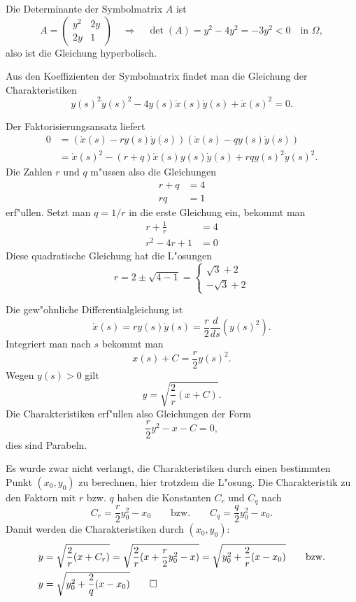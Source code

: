 \begin{loesung}
\begin{teilaufgaben}
\item
Die Determinante der Symbolmatrix $A$ ist
\[
A=\begin{pmatrix}
y^2&2y\\
2y&1
\end{pmatrix}
\quad\Rightarrow\quad
\det (A)=y^2-4y^2=-3y^2<0 \quad\text{in $\Omega$},
\]
also ist die Gleichung hyperbolisch.
\item
Aus den Koeffizienten der Symbolmatrix findet man die Gleichung
der Charakteristiken
\[
y(s)^2\dot y(s)^2-4y(s)\dot x(s)\dot y(s)+\dot x(s)^2=0.
\]
\item
Der Faktorisierungsansatz liefert
\begin{align*}
0&=(\dot x(s)-ry(s)\dot y(s))(\dot x(s)-qy(s)\dot y(s))
\\
&=\dot x(s)^2-(r+q)\dot x(s) y(s)\dot y(s)+rqy(s)^2\dot y(s)^2.
\end{align*}
Die Zahlen $r$ und $q$ m"ussen also die Gleichungen
\begin{align*}
r+q&=4\\
rq&=1
\end{align*}
erf"ullen. Setzt man $q=1/r$ in die erste Gleichung ein, bekommt man
\begin{align*}
r+\frac1r&=4\\
r^2-4r+1&=0
\end{align*}
Diese quadratische Gleichung hat die L"osungen
\[
r
=
2\pm\sqrt{4-1}
=
\begin{cases}
\sqrt{3}+2\\
-\sqrt{3}+2
\end{cases}
\]
\item
Die gew"ohnliche Differentialgleichung ist
\[
\dot x(s)=ry(s)\dot y(s)=\frac{r}{2}\frac{d}{ds}(y(s)^2).
\]
Integriert man nach $s$ bekommt man
\[
x(s) + C=\frac{r}{2}y(s)^2.
\]
Wegen $y(s)>0$ gilt
\[
y = \sqrt{\frac{2}{r}(x+C)}.
\]
Die Charakteristiken erf"ullen also Gleichungen der Form
\[
\frac{r}2y^2-x-C=0,
\]
dies sind Parabeln.
\end{teilaufgaben}
Es wurde zwar nicht verlangt, die Charakteristiken durch einen
bestimmten Punkt $(x_0,y_0)$ zu berechnen, hier trotzdem die
L"osung. Die Charakteristik zu den Faktorn mit $r$ bzw. $q$ haben
die Konstanten $C_r$ und $C_q$ nach
\[
C_r=\frac{r}{2}y_0^2-x_0
\qquad
\text{bzw.}
\qquad
C_q=\frac{q}{2}y_0^2-x_0.
\]
Damit werden die Charakteristiken durch $(x_0,y_0)$:
\begin{align*}
y&=\sqrt{
\frac2r(x+C_r)
}
=
\sqrt{
\frac2r(x+
\frac{r}{2}y_0^2-x
)
}
=\sqrt{y_0^2+\frac2r(x-x_0)}
\qquad\text{bzw.}
\\
y&
=\sqrt{y_0^2+\frac2q(x-x_0)}
\qedhere
\end{align*}
\end{loesung}
